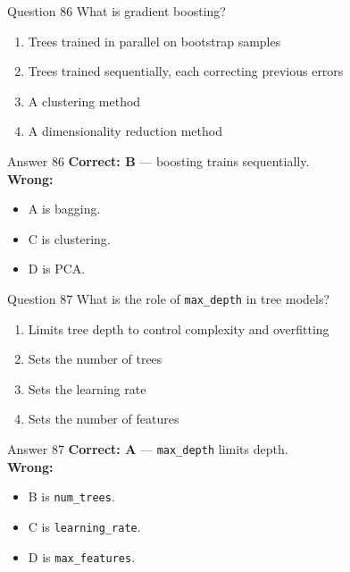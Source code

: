 \documentclass[aspectratio=169,11pt]{beamer}
\begin{document}
	\begin{frame}{Question 86}
		What is gradient boosting?
		\begin{enumerate}[label=\Alph*.]
			\item Trees trained in parallel on bootstrap samples
			\item Trees trained sequentially, each correcting previous errors
			\item A clustering method
			\item A dimensionality reduction method
		\end{enumerate}
	\end{frame}
	\begin{frame}{Answer 86}
		\textbf{Correct: B} --- boosting trains sequentially.\\
		\vspace{0.5em}
		\textbf{Wrong:}
		\begin{itemize}
			\item A is bagging.
			\item C is clustering.
			\item D is PCA.
		\end{itemize}
	\end{frame}
	
	\begin{frame}{Question 87}
		What is the role of \texttt{max\_depth} in tree models?
		\begin{enumerate}[label=\Alph*.]
			\item Limits tree depth to control complexity and overfitting
			\item Sets the number of trees
			\item Sets the learning rate
			\item Sets the number of features
		\end{enumerate}
	\end{frame}
	\begin{frame}{Answer 87}
		\textbf{Correct: A} --- \texttt{max\_depth} limits depth.\\
		\vspace{0.5em}
		\textbf{Wrong:}
		\begin{itemize}
			\item B is \texttt{num\_trees}.
			\item C is \texttt{learning\_rate}.
			\item D is \texttt{max\_features}.
		\end{itemize}
	\end{frame}
	
\end{document}
